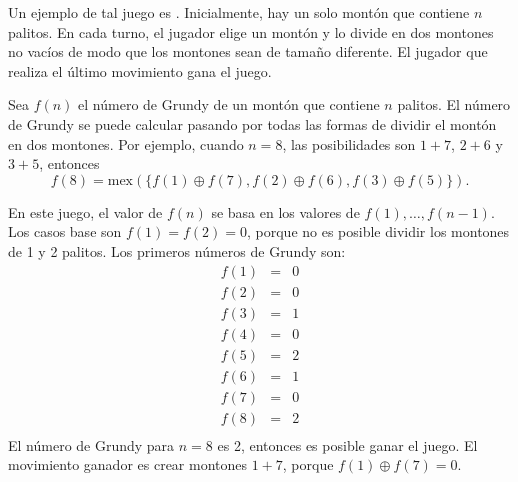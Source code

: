 
Un ejemplo de tal juego es .
Inicialmente, hay un solo montón que contiene $n$ palitos.
En cada turno, el jugador elige un montón y lo divide
en dos montones no vacíos de modo que los montones
sean de tamaño diferente.
El jugador que realiza el último movimiento gana el juego.

Sea $f(n)$ el número de Grundy de un montón
que contiene $n$ palitos.
El número de Grundy se puede calcular pasando
por todas las formas de dividir el montón en
dos montones.
Por ejemplo, cuando $n=8$, las posibilidades
son $1+7$, $2+6$ y $3+5$, entonces
\[f(8)=\textrm{mex}(\{f(1) \oplus f(7), f(2) \oplus f(6), f(3) \oplus f(5)\}).\]

En este juego, el valor de $f(n)$ se basa en los valores
de $f(1),\ldots,f(n-1)$.
Los casos base son $f(1)=f(2)=0$,
porque no es posible dividir los montones
de 1 y 2 palitos.
Los primeros números de Grundy son:
\[
\begin{array}{lcl}
f(1) & = & 0 \\
f(2) & = & 0 \\
f(3) & = & 1 \\
f(4) & = & 0 \\
f(5) & = & 2 \\
f(6) & = & 1 \\
f(7) & = & 0 \\
f(8) & = & 2 \\
\end{array}
\]
El número de Grundy para $n=8$ es 2,
entonces es posible ganar el juego.
El movimiento ganador es crear montones
$1+7$, porque $f(1) \oplus f(7) = 0$.
